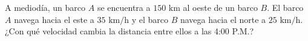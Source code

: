 \item A mediodía, un barco $A$ se encuentra a $150 \text{ km}$ al oeste de un barco $B$. El barco $A$ navega hacia el este a $35 \text{ km/h}$ y el barco $B$ navega hacia el norte a $25 \text{ km/h}$. ¿Con qué velocidad cambia la distancia entre ellos a las 4:00 P.M.?
